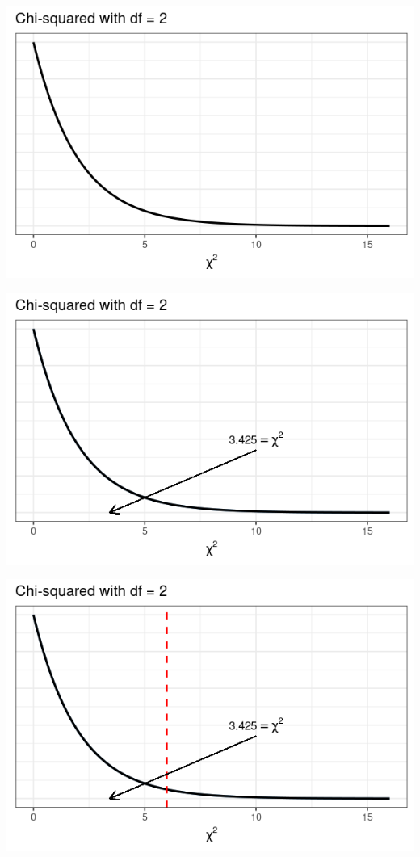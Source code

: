 \documentclass{beamer}
\begin{document}
\begin{frame}
\begin{center}
\includegraphics[scale=0.5]{chi1.png}
\end{center}
\end{frame}

\begin{frame}
\begin{center}
\includegraphics[scale=0.5]{chi2.png}
\end{center}
\end{frame}


\begin{frame}
\begin{center}
\includegraphics[scale=0.5]{chi3.png}
\end{center}
\end{frame}
\end{document}
